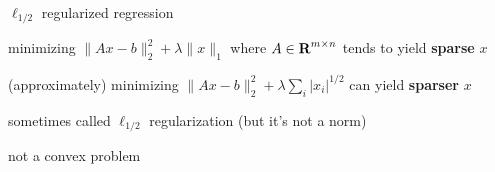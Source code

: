\documentclass[aspectratio=169,11pt]{beamer}
\begin{document}

\begin{frame}{$\ell_{1/2}$ regularized regression}
\BIT
\item minimizing $\|Ax-b\|_2^2+\lambda \| x\|_1$ where $A \in {\mbox{\bfseries\rmfamily R}}^{m \times n}$ tends to yield \textbf{sparse} $x$
\item (approximately) 
minimizing $\|Ax-b\|_2^2+\lambda \sum_i |x_i|^{1/2}$ can yield \textbf{sparser} $x$
\item sometimes called $\ell_{1/2}$ regularization (but it's not a norm)
\item not a convex problem
\EIT
\end{frame}
\end{document}
